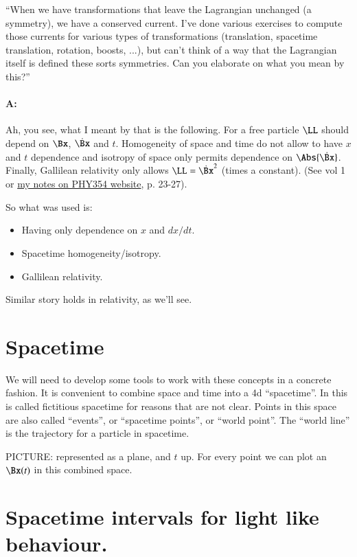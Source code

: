 ``When we have transformations that leave the Lagrangian unchanged (a symmetry), we have a conserved current.  I've done various exercises to compute those currents for various types of transformations (translation, spacetime translation, rotation, boosts, ...), but can't think of a way that the Lagrangian itself is defined these sorts symmetries.  Can you elaborate on what you mean by this?''

\paragraph{A:}

Ah, you see, what I meant by that is the following. For a free particle $\LL$ should depend on $\Bx$, $\dot{\Bx}$ and $t$.  Homogeneity of space and time do not allow to have $x$ and $t$ dependence and isotropy of space only permits dependence on $\Abs{\dot{\Bx}}$. Finally, Gallilean relativity only allows $\LL = \dot{\Bx}^2$ (times a constant). (See \citep{landau1960classical} vol 1 or \href{http://www.physics.utoronto.ca/~poppitz/epoppitz/PHY354_files/CMpp13.1-27.pdf}{my notes on PHY354 website}, p. 23-27).

So what was used is:

\begin{itemize}
\item Having only dependence on $x$ and $dx/dt$.
\item Spacetime homogeneity/isotropy.
\item Gallilean relativity.
\end{itemize}

Similar story holds in relativity, as we'll see. 

\section{Spacetime}

We will need to develop some tools to work with these concepts in a concrete fashion.  It is convenient to combine space  and time  into a 4d ``spacetime''.  In \citep{landau1980classical} this is called fictitious spacetime for reasons that are not clear.  Points in this space are also called ``events'', or ``spacetime points'', or ``world point''.  The ``world line'' is the trajectory for a particle in spacetime.

PICTURE:  represented as a plane, and $t$ up.  For every point we can plot an $\Bx(t)$ in this combined space.

\section{Spacetime intervals for light like behaviour.}

